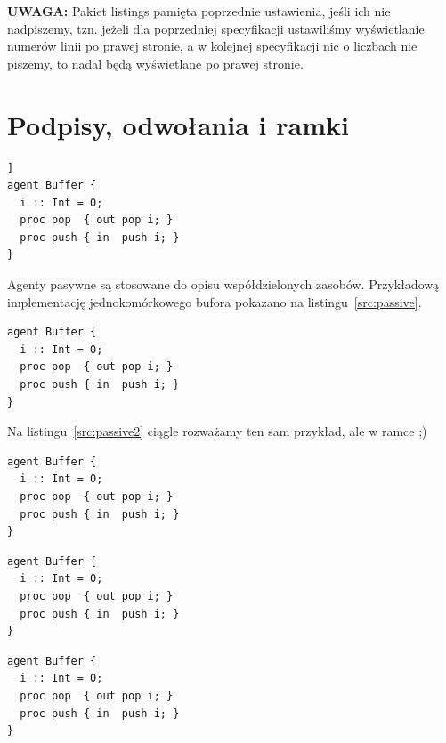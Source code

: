 \documentclass[a4paper,11pt]{article}
\begin{document}
\textbf{UWAGA:} Pakiet listings pamięta poprzednie ustawienia, jeśli ich nie nadpiszemy, tzn. jeżeli dla poprzedniej specyfikacji ustawiliśmy wyświetlanie numerów linii po prawej stronie, a w kolejnej specyfikacji nic o liczbach nie piszemy, to nadal będą wyświetlane po prawej stronie.

\newpage

\section{Podpisy, odwołania i ramki}

\begin{lstlisting}[caption=Przykład agenta pasywnego,
captionpos=b, label=src:passive, belowskip=0mm, aboveskip=0mm, float=[t]]
agent Buffer {
  i :: Int = 0;
  proc pop  { out pop i; }
  proc push { in  push i; }
}
\end{lstlisting}

Agenty pasywne są stosowane do opisu współdzielonych zasobów. Przykładową implementację jednokomórkowego bufora pokazano na listingu~\ref{src:passive}. 


\begin{lstlisting}[caption=Przykład agenta pasywnego, captionpos=b,
label=src:passive2, firstnumber=12,frame=single]
agent Buffer {
  i :: Int = 0;
  proc pop  { out pop i; }
  proc push { in  push i; }
}
\end{lstlisting}

Na listingu~\ref{src:passive2} ciągle rozważamy ten sam przykład, ale w ramce ;)


\begin{lstlisting}[caption=Przykład agenta pasywnego, captionpos=t,
label=src:passive3, frame=tbLR]
agent Buffer {
  i :: Int = 0;
  proc pop  { out pop i; }
  proc push { in  push i; }
}
\end{lstlisting}


\begin{lstlisting}[caption=Przykład agenta pasywnego, captionpos=t,
label=src:passive4, frame=TB]
agent Buffer {
  i :: Int = 0;
  proc pop  { out pop i; }
  proc push { in  push i; }
}
\end{lstlisting}



\begin{lstlisting}[caption=Przykład agenta pasywnego, captionpos=t,
label=src:passive5, frame=LBtr, frameround=tftf]
agent Buffer {
  i :: Int = 0;
  proc pop  { out pop i; }
  proc push { in  push i; }
}
\end{lstlisting}
\end{document}

